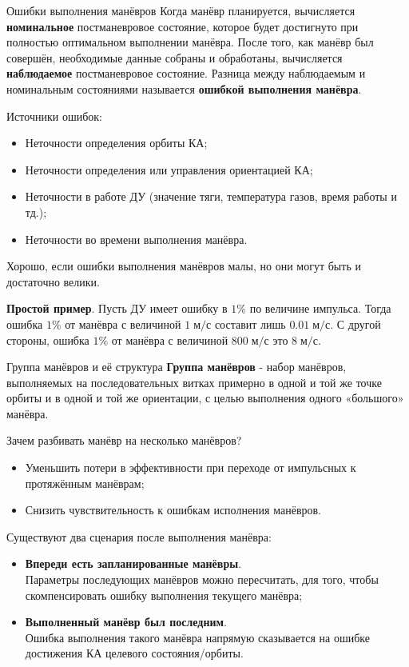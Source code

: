 \documentclass[8pt]{beamer}
\begin{document}
\begin{frame}{Ошибки выполнения манёвров}
Когда манёвр планируется, вычисляется \textbf{номинальное} постманевровое состояние, которое будет достигнуто при полностью оптимальном выполнении манёвра. После того, как манёвр был совершён, необходимые данные собраны и обработаны, вычисляется \textbf{наблюдаемое} постманевровое состояние. Разница между наблюдаемым и номинальным состояниями называется \textbf{ошибкой выполнения манёвра}. 
\begin{center}
\end{center}
Источники ошибок:
\begin{itemize}
    \item Неточности определения орбиты КА;
    \item Неточности определения или управления ориентацией КА;
    \item Неточности в работе ДУ (значение тяги, температура газов, время работы и тд.);
    \item Неточности во времени выполнения манёвра.
\end{itemize}
Хорошо, если ошибки выполнения манёвров малы, но они могут быть и достаточно велики. 

\bigskip

\textbf{Простой пример}. Пусть ДУ имеет ошибку в $1\%$ по величине импульса. Тогда ошибка $1\%$ от манёвра с величиной $1 \; \text{м/с}$ составит лишь $0.01 \; \text{м/с}$. С другой стороны, ошибка $1\%$ от манёвра с величиной $800 \; \text{м/с}$ это $8 \; \text{м/с}$.
\end{frame}

\begin{frame}{Группа манёвров и её структура}
\textbf{Группа манёвров} - набор манёвров, выполняемых на последовательных витках примерно в одной и той же точке орбиты и в одной и той же ориентации, с целью выполнения одного «большого» манёвра.

Зачем разбивать манёвр на несколько манёвров?
\begin{itemize}
    \item Уменьшить потери в эффективности при переходе от импульсных к протяжённым манёврам;
    \item Снизить чувствительность к ошибкам исполнения манёвров.
\end{itemize}

Существуют два сценария после выполнения манёвра:
\begin{itemize}
    \item \textbf{Впереди есть запланированные манёвры}. \\
    Параметры последующих манёвров можно пересчитать, для того, чтобы скомпенсировать ошибку выполнения текущего манёвра;
    \item \textbf{Выполненный манёвр был последним}. \\
    Ошибка выполнения такого манёвра напрямую сказывается на ошибке достижения КА целевого состояния/орбиты.
\end{itemize}
\end{frame}
\end{document}
